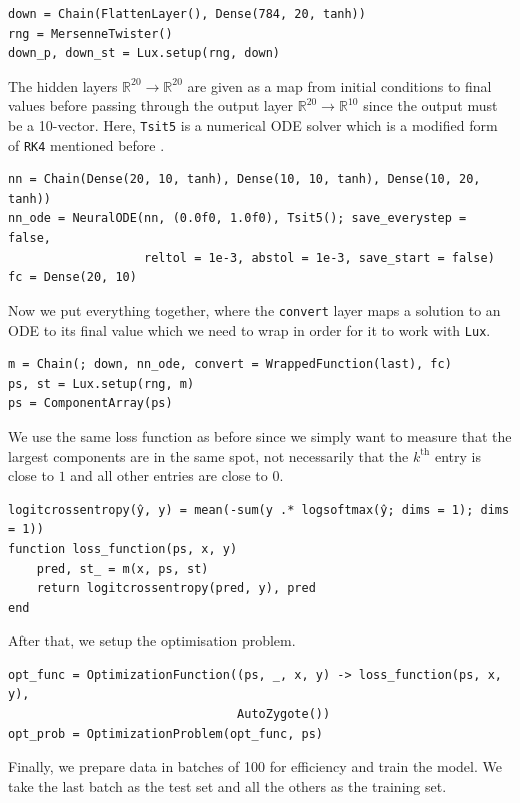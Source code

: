 \documentclass[a4paper,11pt,titlepage]{article}
\theoremstyle{definition}
\theoremstyle{plain}
\theoremstyle{remark}
\begin{document}
\begin{verbatim}
down = Chain(FlattenLayer(), Dense(784, 20, tanh))
rng = MersenneTwister()
down_p, down_st = Lux.setup(rng, down)
\end{verbatim}

The hidden layers $\mathbb{R}^{20}\rightarrow\mathbb{R}^{20}$ are given as a map from initial conditions to final values before passing through the output layer $\mathbb{R}^{20}\rightarrow\mathbb{R}^{10}$ since the output must be a 10-vector. Here, \verb|Tsit5| is a numerical ODE solver which is a modified form of \verb|RK4| mentioned before \cite{TSITOURAS2011770}.

\begin{verbatim}
nn = Chain(Dense(20, 10, tanh), Dense(10, 10, tanh), Dense(10, 20, tanh))
nn_ode = NeuralODE(nn, (0.0f0, 1.0f0), Tsit5(); save_everystep = false,
                   reltol = 1e-3, abstol = 1e-3, save_start = false)
fc = Dense(20, 10)
\end{verbatim}

Now we put everything together, where the \verb|convert| layer maps a solution to an ODE to its final value which we need to wrap in order for it to work with \verb|Lux|.

\begin{verbatim}
m = Chain(; down, nn_ode, convert = WrappedFunction(last), fc)
ps, st = Lux.setup(rng, m)
ps = ComponentArray(ps)
\end{verbatim}

We use the same loss function as before since we simply want to measure that the largest components are in the same spot, not necessarily that the $k^{\mathrm{th}}$ entry is close to $1$ and all other entries are close to $0$.

\begin{verbatim}
logitcrossentropy(ŷ, y) = mean(-sum(y .* logsoftmax(ŷ; dims = 1); dims = 1))
function loss_function(ps, x, y)
    pred, st_ = m(x, ps, st)
    return logitcrossentropy(pred, y), pred
end
\end{verbatim}

After that, we setup the optimisation problem.

\begin{verbatim}
opt_func = OptimizationFunction((ps, _, x, y) -> loss_function(ps, x, y),
                                AutoZygote())
opt_prob = OptimizationProblem(opt_func, ps)
\end{verbatim}

Finally, we prepare data in batches of 100 for efficiency and train the model. We take the last batch as the test set and all the others as the training set.
\end{document}

